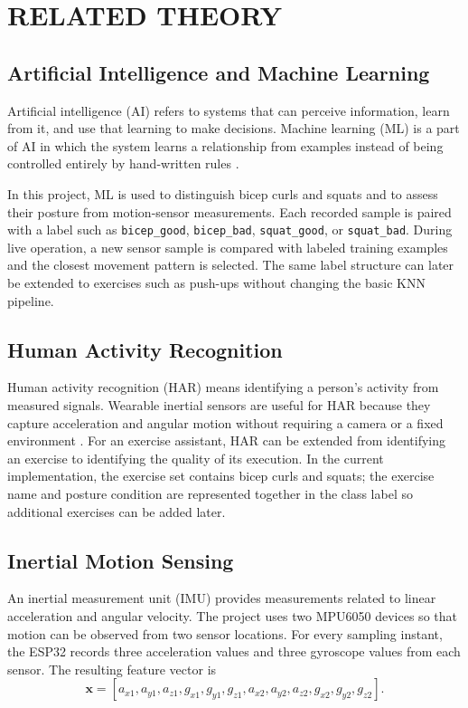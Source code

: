 \chapter{RELATED THEORY}

\section{Artificial Intelligence and Machine Learning}
Artificial intelligence (AI) refers to systems that can perceive information,
learn from it, and use that learning to make decisions. Machine learning (ML) is a
part of AI in which the system learns a relationship from examples instead of being
controlled entirely by hand-written rules
\cite{russell2021aima,geron2022hands,mckinney2022python,lecun2015deep}.

In this project, ML is used to distinguish bicep curls and squats and to assess
their posture from motion-sensor measurements. Each recorded sample is paired with
a label such as \texttt{bicep\_good}, \texttt{bicep\_bad},
\texttt{squat\_good}, or \texttt{squat\_bad}. During live operation, a new sensor
sample is compared with labeled training examples and the closest movement pattern
is selected. The same label structure can later be extended to exercises such as
push-ups without changing the basic KNN pipeline.

\section{Human Activity Recognition}
Human activity recognition (HAR) means identifying a person's activity from measured
signals. Wearable inertial sensors are useful for HAR because they capture
acceleration and angular motion without requiring a camera or a fixed environment
\cite{wang2019wearable,kwapisz2011activity,lara2013survey,bulling2014tutorial,ordonez2016deep}.
For an exercise assistant, HAR can be extended from identifying an exercise to
identifying the quality of its execution. In the current implementation, the
exercise set contains bicep curls and squats; the exercise name and posture condition
are represented together in the class label so additional exercises can be added
later.

\section{Inertial Motion Sensing}
An inertial measurement unit (IMU) provides measurements related to linear
acceleration and angular velocity. The project uses two MPU6050 devices so that
motion can be observed from two sensor locations. For every sampling instant, the
ESP32 records three acceleration values and three gyroscope values from each sensor.
The resulting feature vector is
\begin{equation}
\mathbf{x} = [a_{x1},a_{y1},a_{z1},g_{x1},g_{y1},g_{z1},
a_{x2},a_{y2},a_{z2},g_{x2},g_{y2},g_{z2}].
\end{equation}


